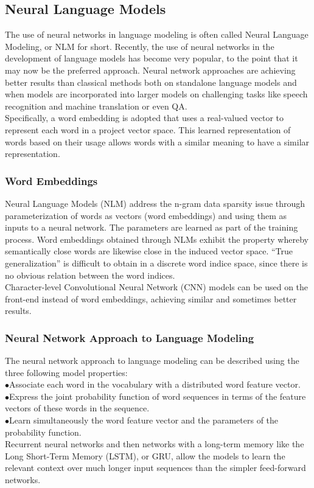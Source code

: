 \subsection{Neural Language Models}
The use of neural networks in language modeling is often called Neural Language Modeling, or NLM for short. Recently, the use of neural networks in the development of language models has become very popular, to the point that it may now be the preferred approach. Neural network approaches are achieving better results than classical methods both on standalone language models and when models are incorporated into larger models on challenging tasks like speech recognition and machine translation or even QA.\\Specifically, a word embedding is adopted that uses a real-valued vector to represent each word in a project vector space.  This learned representation of words based on their usage allows words with a similar meaning to have a similar representation.\subsubsection{Word Embeddings}Neural Language Models (NLM) address the n-gram data sparsity issue through parameterization of words as vectors (word embeddings) and using them as inputs to a neural network. The parameters are learned as part of the training process. Word embeddings obtained through NLMs exhibit the property whereby semantically close words are likewise close in the induced vector space. “True generalization” is difficult to obtain in a discrete word indice space, since there is no obvious relation between the word indices.\\Character-level Convolutional Neural Network (CNN) models can be used on the front-end instead of word embeddings, achieving similar and sometimes better results.\subsubsection{Neural Network Approach to Language Modeling}The neural network approach to language modeling can be described using the three following model properties: \\ \indent$\bullet$Associate each word in the vocabulary with a distributed word feature vector.\\\indent$\bullet$Express the joint probability function of word sequences in terms of the feature vectors of these words in the sequence.\\
\indent$\bullet$Learn simultaneously the word feature vector and the parameters of the probability function.\\
 Recurrent neural networks and then networks with a long-term memory like the Long Short-Term Memory (LSTM), or GRU, allow the models to learn the relevant context over much longer input sequences than the simpler feed-forward networks.
